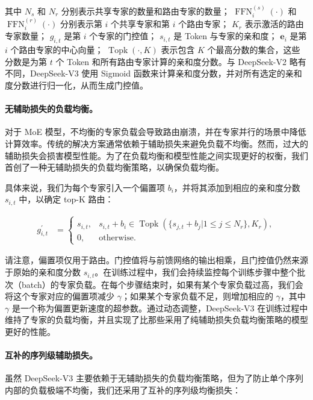 \documentclass[lang=cn,a4paper,newtx]{elegantpaper}
\newcommand{\dsvii}{DeepSeek-V2}
\newcommand{\dsviii}{DeepSeek-V3}
\begin{document}
其中 $N_{s}$ 和 $N_r$ 分别表示共享专家的数量和路由专家的数量； $\operatorname{FFN}^{(s)}_{i}(\cdot)$ 和 $\operatorname{FFN}^{(r)}_{i}(\cdot)$ 分别表示第 $i$ 个共享专家和第 $i$ 个路由专家； $K_{r}$ 表示激活的路由专家数量； $g_{i,t}$ 是第 $i$ 个专家的门控值； $s_{i,t}$ 是 Token 与专家的亲和度； $\mathbf{e}_{i}$ 是第 $i$ 个路由专家的中心向量； $\operatorname{Topk}(\cdot, K)$ 表示包含 $K$ 个最高分数的集合，这些分数是为第 $t$ 个 Token 和所有路由专家计算的亲和度分数。与 \dsvii{} 略有不同，\dsviii{} 使用 Sigmoid 函数来计算亲和度分数，并对所有选定的亲和度分数进行归一化，从而生成门控值。

\paragraph{无辅助损失的负载均衡。}
对于 MoE 模型，不均衡的专家负载会导致路由崩溃，并在专家并行的场景中降低计算效率。传统的解决方案通常依赖于辅助损失来避免负载不均衡。然而，过大的辅助损失会损害模型性能。为了在负载均衡和模型性能之间实现更好的权衡，我们首创了一种无辅助损失的负载均衡策略，以确保负载均衡。

具体来说，我们为每个专家引入一个偏置项 $b_i$，并将其添加到相应的亲和度分数 $s_{i,t}$ 中，以确定 top-K 路由：

\begin{align}
    g^{\prime}_{i,t} & = \begin{cases} 
    s_{i,t}, & s_{i,t} + b_i \in \operatorname{Topk} (\{ s_{j, t} + b_j | 1 \leq j \leq N_r \}, K_{r}), \\
    0, & \text{otherwise}.
    \end{cases}
\end{align}

请注意，偏置项仅用于路由。门控值将与前馈网络的输出相乘，且门控值仍然来源于原始的亲和度分数 $s_{i,t}$。在训练过程中，我们会持续监控每个训练步骤中整个批次（batch）的专家负载。在每个步骤结束时，如果有某个专家负载过高，我们会将这个专家对应的偏置项减少 $\gamma$；如果某个专家负载不足，则增加相应的 $\gamma$，其中 $\gamma$ 是一个称为偏置更新速度的超参数。通过动态调整，\dsviii{} 在训练过程中维持了专家的负载均衡，并且实现了比那些采用了纯辅助损失负载均衡策略的模型更好的性能。

\paragraph{互补的序列级辅助损失。}
虽然 \dsviii{} 主要依赖于无辅助损失的负载均衡策略，但为了防止单个序列内部的负载极端不均衡，我们还采用了互补的序列级均衡损失：
\end{document}
